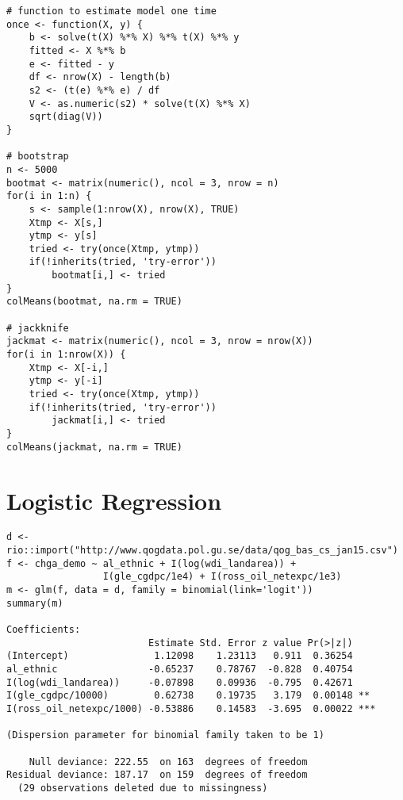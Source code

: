 \documentclass[a4paper,11pt]{article}
\begin{document}
\begin{enumerate}
\begin{solution}
\begin{lstlisting}
# function to estimate model one time
once <- function(X, y) {
    b <- solve(t(X) %*% X) %*% t(X) %*% y
    fitted <- X %*% b
    e <- fitted - y
    df <- nrow(X) - length(b)
    s2 <- (t(e) %*% e) / df
    V <- as.numeric(s2) * solve(t(X) %*% X)
    sqrt(diag(V))
}

# bootstrap
n <- 5000
bootmat <- matrix(numeric(), ncol = 3, nrow = n)
for(i in 1:n) {
    s <- sample(1:nrow(X), nrow(X), TRUE)
    Xtmp <- X[s,]
    ytmp <- y[s]
    tried <- try(once(Xtmp, ytmp))
    if(!inherits(tried, 'try-error'))
        bootmat[i,] <- tried
}
colMeans(bootmat, na.rm = TRUE)

# jackknife
jackmat <- matrix(numeric(), ncol = 3, nrow = nrow(X))
for(i in 1:nrow(X)) {
    Xtmp <- X[-i,]
    ytmp <- y[-i]
    tried <- try(once(Xtmp, ytmp))
    if(!inherits(tried, 'try-error'))
        jackmat[i,] <- tried
}
colMeans(jackmat, na.rm = TRUE)
\end{lstlisting}
\end{solution}




\clearpage
\section{Logistic Regression}

\begin{lstlisting}
d <- rio::import("http://www.qogdata.pol.gu.se/data/qog_bas_cs_jan15.csv")
f <- chga_demo ~ al_ethnic + I(log(wdi_landarea)) + 
                 I(gle_cgdpc/1e4) + I(ross_oil_netexpc/1e3)
m <- glm(f, data = d, family = binomial(link='logit'))
summary(m)

Coefficients:
                         Estimate Std. Error z value Pr(>|z|)    
(Intercept)               1.12098    1.23113   0.911  0.36254    
al_ethnic                -0.65237    0.78767  -0.828  0.40754    
I(log(wdi_landarea))     -0.07898    0.09936  -0.795  0.42671    
I(gle_cgdpc/10000)        0.62738    0.19735   3.179  0.00148 ** 
I(ross_oil_netexpc/1000) -0.53886    0.14583  -3.695  0.00022 ***

(Dispersion parameter for binomial family taken to be 1)

    Null deviance: 222.55  on 163  degrees of freedom
Residual deviance: 187.17  on 159  degrees of freedom
  (29 observations deleted due to missingness)
\end{lstlisting}



\end{enumerate}
\end{document}
